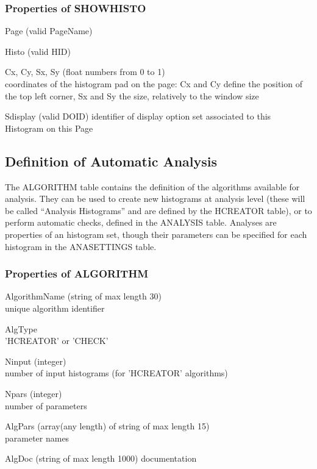 \documentclass{lhcbnote}
\begin{document}
\subsubsection{Properties of SHOWHISTO}
\begin{description}
\item{Page} (valid PageName)
\item{Histo} (valid HID)
\item{Cx, Cy, Sx, Sy} (float numbers from 0 to 1)\\
coordinates of the histogram pad on the page: Cx and Cy define the
position of the top left corner, Sx and Sy the size, relatively to the
window size
\item{Sdisplay} (valid DOID)
identifier of display option set associated to this Histogram on this Page
\end{description}

\subsection{Definition of Automatic Analysis}
The ALGORITHM table contains the definition of the algorithms
available for analysis. They can be used to create new histograms at
analysis level (these will be called ``Analysis Histograms'' and are
defined by the HCREATOR table), or to perform automatic checks,
defined in the ANALYSIS table. Analyses are properties of an histogram
set, though their parameters can be specified for each histogram in
the ANASETTINGS table.

\subsubsection{Properties of ALGORITHM}
\begin{description}
\item{AlgorithmName} (string of max length 30)\\
unique algorithm identifier
\item{AlgType} \\
'HCREATOR' or 'CHECK'
\item{Ninput} (integer)\\
number of input histograms (for 'HCREATOR' algorithms)
\item{Npars} (integer)\\
number of parameters
\item{AlgPars} (array(any length) of string of max length 15)\\
parameter names
\item{AlgDoc} (string of max length 1000)
documentation
\end{description}
\end{document}
